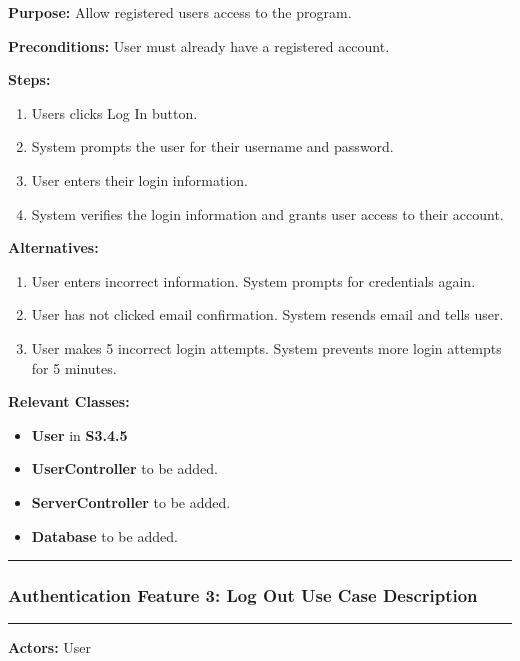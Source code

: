 \documentclass[twoside,letterpaper]{article}
\begin{document}
	\noindent\textbf{Purpose:} Allow registered users access to the program.  \newline
	
	\noindent\textbf{Preconditions:} User must already have a registered account.  \newline
	
	\noindent\textbf{Steps:}
	\begin{enumerate}
		\item Users clicks Log In button.
		\item System prompts the user for their username and password.
		\item User enters their login information.
		\item System verifies the login information and grants user access to their account.
	\end{enumerate}
	\noindent\textbf{Alternatives:}
		\begin{enumerate}
			\item User enters incorrect information. System prompts for credentials again.
			\item User has not clicked email confirmation. System resends email and tells user.
			\item User makes 5 incorrect login attempts. System prevents more login attempts for 5 minutes.
		\end{enumerate}
	
	\noindent\textbf{Relevant Classes:}
	\begin{itemize}
		\item \textbf{User} in \textbf{S3.4.5}
		\item \textbf{UserController} to be added.
		\item \textbf{ServerController} to be added.
		\item \textbf{Database} to be added.
	\end{itemize}
	\vspace{8pt}
	\hrule
	\newpage
	
	\subsubsection[Authentication Feature 3: Log Out Use Case Description]{\rmfamily\bfseries\color{black}
		Authentication Feature 3: Log Out Use Case Description}
		\label{a:uc3}
	\hypertarget{RefHeading22059017292}{}
	
	\hrule
	\vspace{8pt}
	\noindent\textbf{Actors:} User \newline
	
\end{document}
